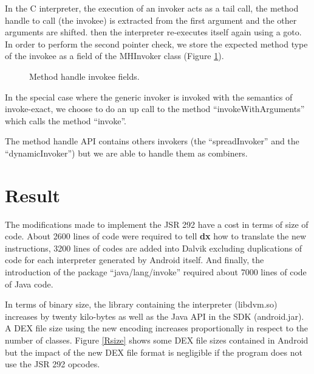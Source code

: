 \documentclass{sig-alternate}
\def \Jsr{JSR\xspace}
\def \JSR{\Jsr 292\xspace}
\newcommand{\fixme}[1]{{\color{red}FIXME #1}}
\begin{document}
      In the C interpreter, the execution of an invoker acts as a tail call,
      the method handle to call (the invokee) is extracted from the first argument and the other arguments are shifted.
      then the interpreter re-executes itself again using a goto.
      In order to perform the second pointer check, we store the expected method type of the invokee as a field of the MHInvoker class
      (Figure \ref{invokeeFields}).

      \begin{figure}[!h]
        \centering \vspace{-1.5em}
        \caption{Method handle invokee fields.}
        \label{invokeeFields}
      \end{figure}

      In the special case where the generic invoker is invoked with the semantics of invoke-exact,
      we choose to do an up call to the method ``invokeWithArguments'' which calls the method ``invoke''.

      The method handle API contains others invokers (the ``spreadInvoker'' and the ``dynamicInvoker'')
      but we are able to handle them as combiners.

\section{Result}
 \label{result}

  The modifications made to implement the \JSR have a cost in terms of size of code.
  About 2600 lines of code were required to tell {\bf dx} how to translate the new instructions,
  3200 lines of codes are added into Dalvik excluding duplications of code for each interpreter generated by Android itself.
  And finally, the introduction of the package ``java/lang/invoke'' required about 7000 lines of code of Java code.


  In terms of binary size, the library containing the interpreter (libdvm.so) increases by twenty kilo-bytes
  as well as the Java API in the SDK (android.jar).
  A DEX file size using the new encoding increases proportionally in respect to the number of classes.
  Figure \ref{Rsize} shows some DEX file sizes contained in Android but
  the impact of the new DEX file format is negligible if the program does not use the \JSR opcodes.
\end{document}
